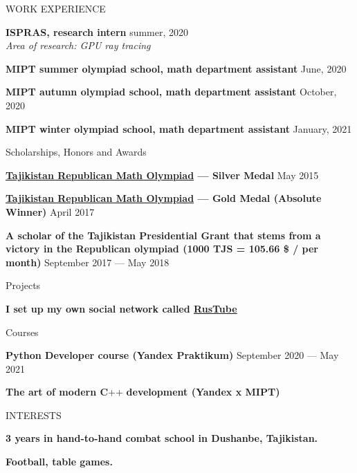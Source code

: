 \documentclass{resume}
\begin{document}



\begin{rSection}{WORK EXPERIENCE} \itemsep -1pt {}  

\item \textbf{ISPRAS, research intern} \hfill summer, 2020 \\
\textit{Area of research: GPU ray tracing}

\item \textbf{MIPT summer olympiad school, math department assistant} \hfill June, 2020 
\item \textbf{MIPT autumn olympiad school, math department assistant} \hfill October, 2020 
\item \textbf{MIPT winter olympiad school, math department assistant} \hfill January, 2021 
\textit{}
\end{rSection}

\begin{rSection}{Scholarships, Honors and Awards} \itemsep -1pt {}  

\item \textbf{\href{http://mri.tj/?page_id=124}{\underline{Tajikistan Republican Math Olympiad}} --- Silver Medal} \hfill May 2015
\item \textbf{\href{http://mri.tj/?page_id=124}{\underline{Tajikistan Republican Math Olympiad}} --- Gold Medal (Absolute Winner)} \hfill April 2017
\item {\textbf{A scholar of the Tajikistan Presidential Grant that stems from a victory in the Republican olympiad (1000 TJS = 105.66 \$ / per month)}} \hfill September 2017 --- May 2018
\end{rSection}

\begin{rSection}{Projects} \itemsep -1pt {}
\item \textbf{I set up my own social network called \href{https://github.com/s1td1kov/RusTube}{\underline{RusTube}}}
\item 
\end{rSection}

\begin{rSection}{Courses} \itemsep -1pt {}
\item {\textbf{Python Developer course (Yandex Praktikum)}} \hfill September 2020 --- May 2021
\item {\textbf{The art of modern C}}++ \textbf{development (Yandex x MIPT)}
\end{rSection}

\begin{rSection}{INTERESTS}
\item \textbf{3 years in hand-to-hand combat school in Dushanbe, Tajikistan.}
\item \textbf{Football,  table games.}
\end{rSection}
\end{document}
